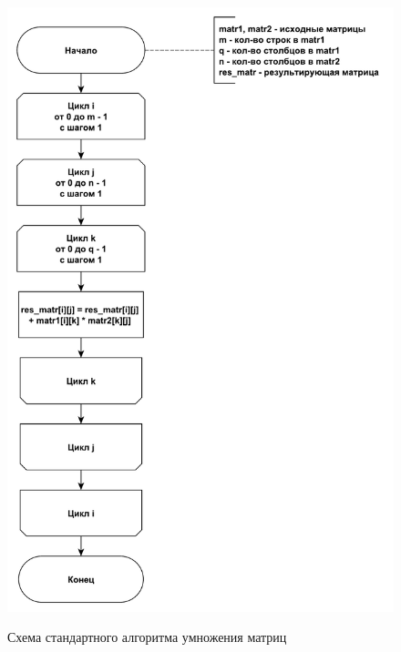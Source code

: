 \documentclass[a4paper,12pt]{article}
\begin{document}
        \begin{figure}[h!]
        	\begin{center}
        		{\includegraphics[scale = 0.5]{schema01.pdf}}
        		\caption{Схема стандартного алгоритма умножения матриц}
        		\label{fig:schema_mult_st}
        	\end{center}
        \end{figure}
        
\end{document}
